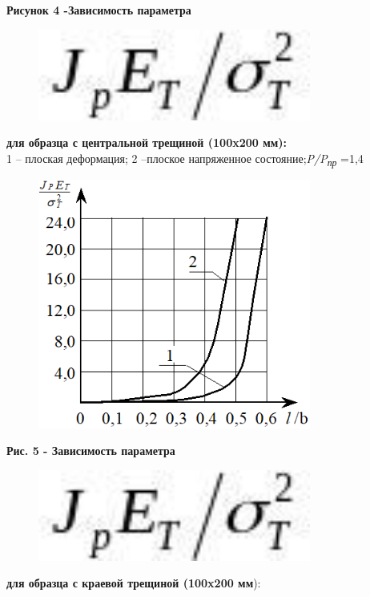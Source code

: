 {\bfseries Рисунок 4 -Зависимость параметра}
\begin{figure}[H]
	\centering
	\includegraphics[width=0.8\textwidth]{assets/1189}
	\caption*{}
\end{figure} {\bfseries для образца с центральной
трещиной (100x200 мм):}\\
1 -- плоская деформация; 2 --плоское напряженное
состояние;\emph{P/P\textsubscript{пр}} =1,4

\begin{figure}[H]
	\centering
	\includegraphics[width=0.8\textwidth]{assets/1190}
	\caption*{}
\end{figure}

{\bfseries Рис. 5 - Зависимость параметра}
\begin{figure}[H]
	\centering
	\includegraphics[width=0.8\textwidth]{assets/1191}
	\caption*{}
\end{figure} {\bfseries для образца с краевой
трещиной (100x200 мм}):


